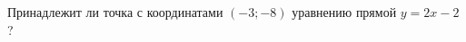 \begin{ex}
	\begin{condition}
		Принадлежит ли точка с координатами \( (-3;-8) \) уравнению прямой \( y=2x-2 \)?
	\end{condition}
\end{ex}